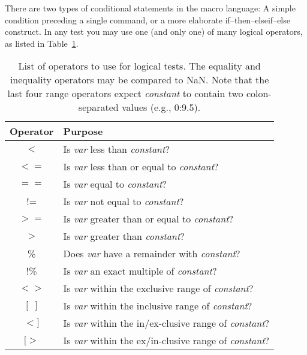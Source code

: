 There are two types of conditional statements in the macro language: A simple condition
preceding a single command, or a more elaborate if--then--elseif--else construct.  In any test you
may use one (and only one) of many logical operators, as listed in Table~\ref{tbl:custop}.
\begin{table}[H]
\small
\centering
\begin{tabular}{cl} \hline
\textbf{Operator} 	& 	\textbf{Purpose}						\\ \hline \hline
$<$ 		& 	Is \emph{var} less than \emph{constant}?				\\
$<=$ 		& 	Is \emph{var} less than or equal to \emph{constant}?			\\
$==$		& 	Is \emph{var} equal to \emph{constant}?					\\
!= 		& 	Is \emph{var} not equal to \emph{constant}?				\\
$>=$ 		& 	Is \emph{var} greater than or equal to \emph{constant}?			\\
$>$ 		& 	Is \emph{var} greater than \emph{constant}?				\\
\% 		& 	Does \emph{var} have a remainder with \emph{constant}?			\\
!\% 		& 	Is \emph{var} an exact multiple of \emph{constant}?			\\
$<>$ 		& 	Is \emph{var} within the exclusive range of \emph{constant}?		\\
$[\;]$		& 	Is \emph{var} within the inclusive range of \emph{constant}?		\\
$<]$ 		& 	Is \emph{var} within the in/ex-clusive range of \emph{constant}?	\\
$[>$		& 	Is \emph{var} within the ex/in-clusive range of \emph{constant}?	\\ \hline
\end{tabular}
\label{tbl:custop}
\caption{List of operators to use for logical tests.  The equality and inequality operators
may be compared to NaN.  Note that the last four range operators
expect \emph{constant} to contain two colon-separated values (e.g., 0:9.5).}
\end{table} 

